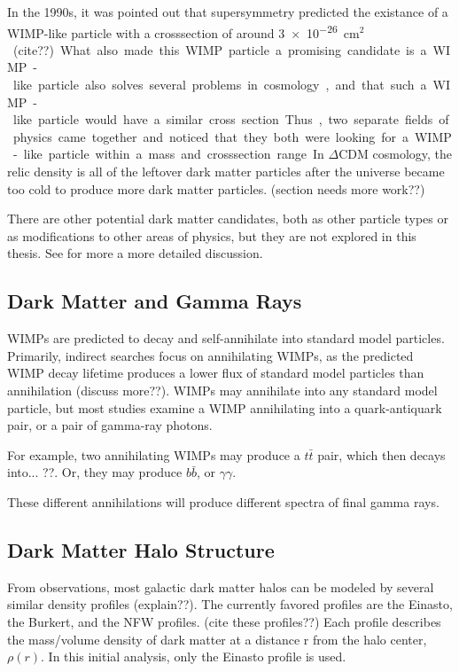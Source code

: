     In the 1990s, it was pointed out that supersymmetry predicted the existance of a WIMP-like particle with a crosssection of around \nicetilde \SI{3e-26}{cm$^2$} {\color{red}(cite??)}.
    What also made this WIMP particle a promising candidate is a WIMP-like particle also solves several problems in cosmology, and that such a WIMP-like particle would have a similar cross section.
    Thus, two separate fields of physics came together and noticed that they both were looking for a WIMP-like particle within a mass and crosssection range.
    In $\Delta$CDM cosmology, the relic density is all of the leftover dark matter particles after the universe became too cold to produce more dark matter particles.
    {\color{red}(section needs more work??)}

    There are other potential dark matter candidates, both as other particle types or as modifications to other areas of physics, but they are not explored in this thesis.
    See \cite{DMPrimer} for more a more detailed discussion.
    
  \subsection{Dark Matter and Gamma Rays}
    WIMPs are predicted to decay and self-annihilate into standard model particles.
    Primarily, indirect searches focus on annihilating WIMPs, as the predicted WIMP decay lifetime produces a lower flux of standard model particles than annihilation {\color{red}(discuss more??)}.
    WIMPs may annihilate into any standard model particle, but most studies examine a WIMP annihilating into a quark-antiquark pair, or a pair of gamma-ray photons.

    For example, two annihilating WIMPs may produce a $t\bar{t}$ pair, which then decays into... {\color{red}??}.
    Or, they may produce $b\bar{b}$, or $\gamma\gamma$.

    These different annihilations will produce different spectra of final gamma rays.
  
  \subsection{Dark Matter Halo Structure}\label{dm_spatial}
    From observations, most galactic dark matter halos can be modeled by several similar density profiles {\color{red}(explain??)}.
    The currently favored profiles are the Einasto, the Burkert, and the NFW profiles. {\color{red}(cite these profiles??)}
    Each profile describes the mass/volume density of dark matter at a distance r from the halo center, $\rho(r)$.
    In this initial analysis, only the Einasto profile is used.

